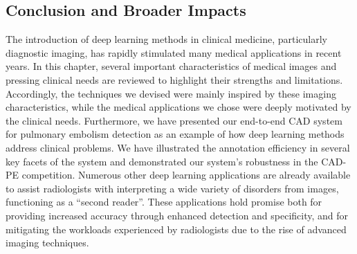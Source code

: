\subsection{Conclusion and Broader Impacts}
\label{ch6:discussion_conclusion:conclusion_broader_impacts}

The introduction of deep learning methods in clinical medicine, particularly diagnostic imaging, has rapidly stimulated many medical applications in recent years. In this chapter, several important characteristics of medical images and pressing clinical needs are reviewed to highlight their strengths and limitations. Accordingly, the techniques we devised were mainly inspired by these imaging characteristics, while the medical applications we chose were deeply motivated by the clinical needs. Furthermore, we have presented our end-to-end CAD system for pulmonary embolism detection as an example of how deep learning methods address clinical problems. We have illustrated the annotation efficiency in several key facets of the system and demonstrated our system's robustness in the CAD-PE competition. Numerous other deep learning applications are already available to assist radiologists with interpreting a wide variety of disorders from images, functioning as a ``second reader''. These applications hold promise both for providing increased accuracy through enhanced detection and specificity, and for mitigating the workloads experienced by radiologists due to the rise of advanced imaging techniques. 








